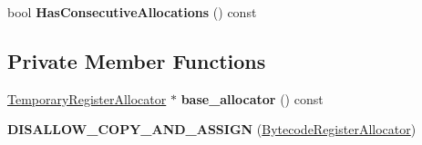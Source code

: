 \begin{DoxyCompactItemize}
\item 
bool {\bfseries Has\+Consecutive\+Allocations} () const \hypertarget{classv8_1_1internal_1_1interpreter_1_1_bytecode_register_allocator_a073e3c70eb2a71cbdbd66f36df3a86a7}{}\label{classv8_1_1internal_1_1interpreter_1_1_bytecode_register_allocator_a073e3c70eb2a71cbdbd66f36df3a86a7}

\end{DoxyCompactItemize}
\subsection*{Private Member Functions}
\begin{DoxyCompactItemize}
\item 
\hyperlink{classv8_1_1internal_1_1interpreter_1_1_temporary_register_allocator}{Temporary\+Register\+Allocator} $\ast$ {\bfseries base\+\_\+allocator} () const \hypertarget{classv8_1_1internal_1_1interpreter_1_1_bytecode_register_allocator_aea93748ac40b73eda2e96646630c5ced}{}\label{classv8_1_1internal_1_1interpreter_1_1_bytecode_register_allocator_aea93748ac40b73eda2e96646630c5ced}

\item 
{\bfseries D\+I\+S\+A\+L\+L\+O\+W\+\_\+\+C\+O\+P\+Y\+\_\+\+A\+N\+D\+\_\+\+A\+S\+S\+I\+GN} (\hyperlink{classv8_1_1internal_1_1interpreter_1_1_bytecode_register_allocator}{Bytecode\+Register\+Allocator})\hypertarget{classv8_1_1internal_1_1interpreter_1_1_bytecode_register_allocator_a5dfbfbb9f8c506f88c14ad9c1617ff34}{}\label{classv8_1_1internal_1_1interpreter_1_1_bytecode_register_allocator_a5dfbfbb9f8c506f88c14ad9c1617ff34}

\end{DoxyCompactItemize}

